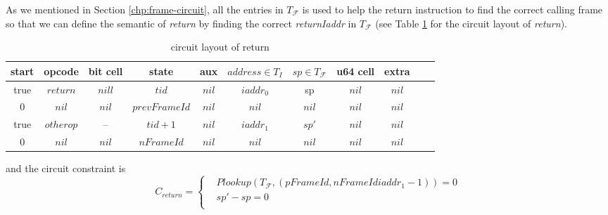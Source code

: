  As we mentioned in Section \ref{chp:frame-circuit}, all the entries in $T_\mathcal{F}$ is used to help the return instruction to find the correct calling frame so that we can define the semantic of \emph{return} by finding the correct \emph{returnIaddr} in $T_\mathcal{F}$ (see Table \ref{tbl:return-instruction} for the circuit layout of \emph{return}).
\begin{table}[!h]
\begin{center}
\begin{tabular}{ | c | c | c | c | c | c | c | c | c | c | c | }
  \hline
  start & opcode & bit cell & state & aux & $address \in T_{I}$ & $sp \in T_\mathcal{F}$& u64 cell & extra \\ 
  \hline
   true & $return$ & $nill$ & $tid$ & $nil$ & $iaddr_0$ & sp & $nil$ & $nil$\\ 
 \hline
   0 & $nil$ & $nil$ & $prevFrameId$ & $nil$ & $nil$ & $nil$ & $nil$ & $nil$\\ 
 \hline
   true & $otherop$ & -- & $tid + 1$ & $nil$ & $iaddr_1$ & $sp'$ & $nil$ & $nil$\\
 \hline
   0 & $nil$ & $nil$ & $nFrameId$ & $nil$ & $nil$ & $nil$ & $nil$ & $nil$\\ 
 \hline
\end{tabular}
\caption{circuit layout of return}
\label{tbl:return-instruction}
\end{center}
\end{table}

\noindent and the circuit constraint is
\[
    C_{return} =  \begin{cases}
        &Plookup(T_\mathcal{F}, (pFrameId, nFrameId iaddr_1 - 1)) = 0 \\
        &sp' - sp = 0 \\
    \end{cases}
\]


